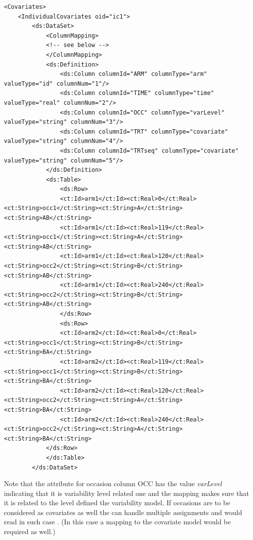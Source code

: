 \lstset{language=XML}
\begin{lstlisting}
<Covariates>
    <IndividualCovariates oid="ic1">
        <ds:DataSet>
            <ColumnMapping>
            <!-- see below -->
            </ColumnMapping>
            <ds:Definition>
                <ds:Column columnId="ARM" columnType="arm" valueType="id" columnNum="1"/>
                <ds:Column columnId="TIME" columnType="time" valueType="real" columnNum="2"/>
                <ds:Column columnId="OCC" columnType="varLevel" valueType="string" columnNum="3"/>
                <ds:Column columnId="TRT" columnType="covariate" valueType="string" columnNum="4"/>
                <ds:Column columnId="TRTseq" columnType="covariate" valueType="string" columnNum="5"/>
            </ds:Definition>
            <ds:Table>
                <ds:Row>
	            <ct:Id>arm1</ct:Id><ct:Real>0</ct:Real><ct:String>occ1</ct:String><ct:String>A</ct:String><ct:String>AB</ct:String>
	            <ct:Id>arm1</ct:Id><ct:Real>119</ct:Real><ct:String>occ1</ct:String><ct:String>A</ct:String><ct:String>AB</ct:String>
	            <ct:Id>arm1</ct:Id><ct:Real>120</ct:Real><ct:String>occ2</ct:String><ct:String>B</ct:String><ct:String>AB</ct:String>
	            <ct:Id>arm1</ct:Id><ct:Real>240</ct:Real><ct:String>occ2</ct:String><ct:String>B</ct:String><ct:String>AB</ct:String>
                </ds:Row>
                <ds:Row>
	            <ct:Id>arm2</ct:Id><ct:Real>0</ct:Real><ct:String>occ1</ct:String><ct:String>B</ct:String><ct:String>BA</ct:String>
	            <ct:Id>arm2</ct:Id><ct:Real>119</ct:Real><ct:String>occ1</ct:String><ct:String>B</ct:String><ct:String>BA</ct:String>
	            <ct:Id>arm2</ct:Id><ct:Real>120</ct:Real><ct:String>occ2</ct:String><ct:String>A</ct:String><ct:String>BA</ct:String>
	            <ct:Id>arm2</ct:Id><ct:Real>240</ct:Real><ct:String>occ2</ct:String><ct:String>A</ct:String><ct:String>BA</ct:String>
	        </ds:Row>
            </ds:Table>
        </ds:DataSet>
\end{lstlisting}
Note that the  attribute for occasion column OCC has the value
\textit{varLevel} indicating that it is variability level related one and the mapping
makes sure that it is related to the  level defined the variability model.
If occasions are to be considered as covariates as well the  can 
handle multiple assignments and would read in such case .
(In this case a mapping to the covariate model would be required as well.)

